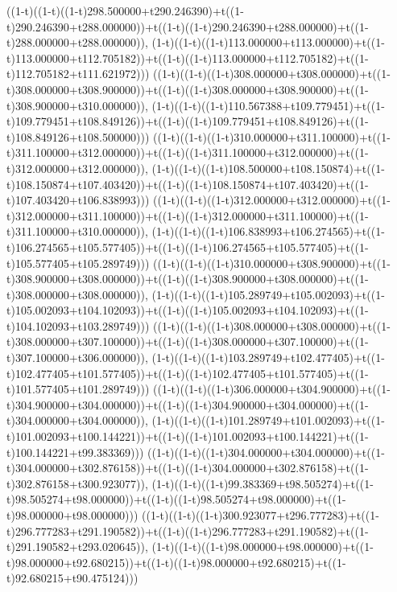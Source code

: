 ((1-t)((1-t)((1-t)298.500000+t290.246390)+t((1-t)290.246390+t288.000000))+t((1-t)((1-t)290.246390+t288.000000)+t((1-t)288.000000+t288.000000)),                                     (1-t)((1-t)((1-t)113.000000+t113.000000)+t((1-t)113.000000+t112.705182))+t((1-t)((1-t)113.000000+t112.705182)+t((1-t)112.705182+t111.621972)))
((1-t)((1-t)((1-t)308.000000+t308.000000)+t((1-t)308.000000+t308.900000))+t((1-t)((1-t)308.000000+t308.900000)+t((1-t)308.900000+t310.000000)),                                     (1-t)((1-t)((1-t)110.567388+t109.779451)+t((1-t)109.779451+t108.849126))+t((1-t)((1-t)109.779451+t108.849126)+t((1-t)108.849126+t108.500000)))
((1-t)((1-t)((1-t)310.000000+t311.100000)+t((1-t)311.100000+t312.000000))+t((1-t)((1-t)311.100000+t312.000000)+t((1-t)312.000000+t312.000000)),                                     (1-t)((1-t)((1-t)108.500000+t108.150874)+t((1-t)108.150874+t107.403420))+t((1-t)((1-t)108.150874+t107.403420)+t((1-t)107.403420+t106.838993)))
((1-t)((1-t)((1-t)312.000000+t312.000000)+t((1-t)312.000000+t311.100000))+t((1-t)((1-t)312.000000+t311.100000)+t((1-t)311.100000+t310.000000)),                                     (1-t)((1-t)((1-t)106.838993+t106.274565)+t((1-t)106.274565+t105.577405))+t((1-t)((1-t)106.274565+t105.577405)+t((1-t)105.577405+t105.289749)))
((1-t)((1-t)((1-t)310.000000+t308.900000)+t((1-t)308.900000+t308.000000))+t((1-t)((1-t)308.900000+t308.000000)+t((1-t)308.000000+t308.000000)),                                     (1-t)((1-t)((1-t)105.289749+t105.002093)+t((1-t)105.002093+t104.102093))+t((1-t)((1-t)105.002093+t104.102093)+t((1-t)104.102093+t103.289749)))
((1-t)((1-t)((1-t)308.000000+t308.000000)+t((1-t)308.000000+t307.100000))+t((1-t)((1-t)308.000000+t307.100000)+t((1-t)307.100000+t306.000000)),                                     (1-t)((1-t)((1-t)103.289749+t102.477405)+t((1-t)102.477405+t101.577405))+t((1-t)((1-t)102.477405+t101.577405)+t((1-t)101.577405+t101.289749)))
((1-t)((1-t)((1-t)306.000000+t304.900000)+t((1-t)304.900000+t304.000000))+t((1-t)((1-t)304.900000+t304.000000)+t((1-t)304.000000+t304.000000)),                                     (1-t)((1-t)((1-t)101.289749+t101.002093)+t((1-t)101.002093+t100.144221))+t((1-t)((1-t)101.002093+t100.144221)+t((1-t)100.144221+t99.383369)))
((1-t)((1-t)((1-t)304.000000+t304.000000)+t((1-t)304.000000+t302.876158))+t((1-t)((1-t)304.000000+t302.876158)+t((1-t)302.876158+t300.923077)),                                     (1-t)((1-t)((1-t)99.383369+t98.505274)+t((1-t)98.505274+t98.000000))+t((1-t)((1-t)98.505274+t98.000000)+t((1-t)98.000000+t98.000000)))
((1-t)((1-t)((1-t)300.923077+t296.777283)+t((1-t)296.777283+t291.190582))+t((1-t)((1-t)296.777283+t291.190582)+t((1-t)291.190582+t293.020645)),                                     (1-t)((1-t)((1-t)98.000000+t98.000000)+t((1-t)98.000000+t92.680215))+t((1-t)((1-t)98.000000+t92.680215)+t((1-t)92.680215+t90.475124)))
